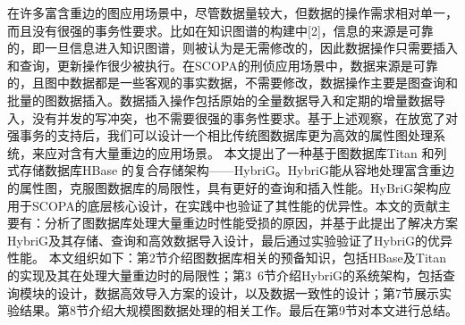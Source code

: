 在许多富含重边的图应用场景中，尽管数据量较大，但数据的操作需求相对单一，而且没有很强的事务性要求。比如在知识图谱的构建中[2]，信息的来源是可靠的，即一旦信息进入知识图谱，则被认为是无需修改的，因此数据操作只需要插入和查询，更新操作很少被执行。在SCOPA的刑侦应用场景中，数据来源是可靠的，且图中数据都是一些客观的事实数据，不需要修改，数据操作主要是图查询和批量的图数据插入。数据插入操作包括原始的全量数据导入和定期的增量数据导入，没有并发的写冲突，也不需要很强的事务性要求。基于上述观察，在放宽了对强事务的支持后，我们可以设计一个相比传统图数据库更为高效的属性图处理系统，来应对含有大量重边的应用场景。
本文提出了一种基于图数据库Titan 和列式存储数据库HBase 的复合存储架构——HybriG。HybriG能从容地处理富含重边的属性图，克服图数据库的局限性，具有更好的查询和插入性能。HyBriG架构应用于SCOPA的底层核心设计，在实践中也验证了其性能的优异性。本文的贡献主要有：分析了图数据库处理大量重边时性能受损的原因，并基于此提出了解决方案HybriG及其存储、查询和高效数据导入设计，最后通过实验验证了HybriG的优异性能。
本文组织如下：第2节介绍图数据库相关的预备知识，包括HBase及Titan的实现及其在处理大量重边时的局限性；第3~6节介绍HybriG的系统架构，包括查询模块的设计，数据高效导入方案的设计，以及数据一致性的设计；第7节展示实验结果。第8节介绍大规模图数据处理的相关工作。最后在第9节对本文进行总结。


